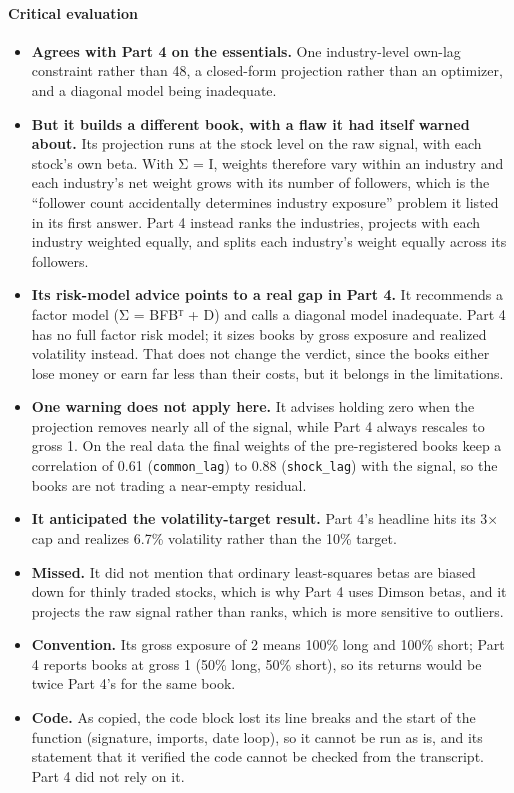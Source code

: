 \hypertarget{critical-evaluation-1}{%
\paragraph{Critical evaluation}\label{critical-evaluation-1}}

\begin{itemize}
\tightlist
\item
  \textbf{Agrees with Part 4 on the essentials.} One industry-level own-lag constraint rather
  than 48, a closed-form projection rather than an optimizer, and a diagonal model being
  inadequate.
\item
  \textbf{But it builds a different book, with a flaw it had itself warned about.} Its
  projection runs at the stock level on the raw signal, with each stock's own beta. With
  Σ = I, weights therefore vary within an industry and each industry's net weight grows with
  its number of followers, which is the ``follower count accidentally determines industry
  exposure'' problem it listed in its first answer. Part 4 instead ranks the industries,
  projects with each industry weighted equally, and splits each industry's weight equally
  across its followers.
\item
  \textbf{Its risk-model advice points to a real gap in Part 4.} It recommends a factor model
  (Σ = BFBᵀ + D) and calls a diagonal model inadequate. Part 4 has no full factor risk
  model; it sizes books by gross exposure and realized volatility instead. That does not change the
  verdict, since the books either lose money or earn far less than their costs, but it
  belongs in the limitations.
\item
  \textbf{One warning does not apply here.} It advises holding zero when the projection removes
  nearly all of the signal, while Part 4 always rescales to gross 1. On the real data the
  final weights of the pre-registered books keep a correlation of 0.61 (\texttt{common\_lag}) to
  0.88 (\texttt{shock\_lag}) with the signal, so the books are not trading a near-empty residual.
\item
  \textbf{It anticipated the volatility-target result.} Part 4's headline hits its 3× cap and
  realizes 6.7\% volatility rather than the 10\% target.
\item
  \textbf{Missed.} It did not mention that ordinary least-squares betas are biased down for
  thinly traded stocks, which is why Part 4 uses Dimson betas, and it projects the raw
  signal rather than ranks, which is more sensitive to outliers.
\item
  \textbf{Convention.} Its gross exposure of 2 means 100\% long and 100\% short; Part 4 reports
  books at gross 1 (50\% long, 50\% short), so its returns would be twice Part 4's for the
  same book.
\item
  \textbf{Code.} As copied, the code block lost its line breaks and the start of the function
  (signature, imports, date loop), so it cannot be run as is, and its statement that it
  verified the code cannot be checked from the transcript. Part 4 did not rely on it.
\end{itemize}

